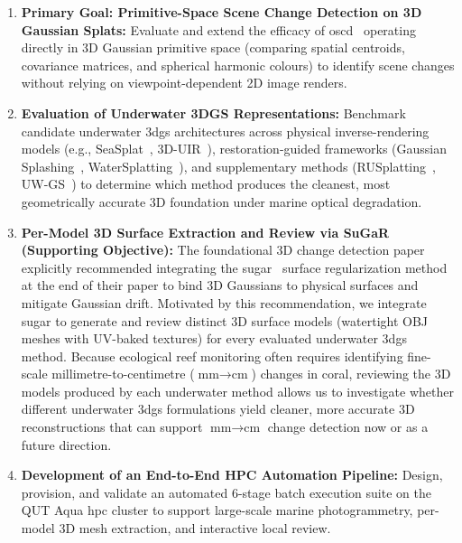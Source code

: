 \begin{enumerate}
    \item \textbf{Primary Goal: Primitive-Space Scene Change Detection on 3D Gaussian Splats:} Evaluate and extend the efficacy of \gls{oscd}~\cite{galappaththige2026pixelsprimitivesscenechange} operating directly in 3D Gaussian primitive space (comparing spatial centroids, covariance matrices, and spherical harmonic colours) to identify scene changes without relying on viewpoint-dependent 2D image renders.
    \item \textbf{Evaluation of Underwater 3DGS Representations:} Benchmark candidate underwater \gls{3dgs} architectures across physical inverse-rendering models (e.g., SeaSplat~\cite{11128502}, 3D-UIR~\cite{huang2025restorationreconstructionrethinking3d}), restoration-guided frameworks (Gaussian Splashing~\cite{mualem2025gaussiansplashingdirectvolumetric}, WaterSplatting~\cite{li2025watersplattingfastunderwater3d}), and supplementary methods (RUSplatting~\cite{jiang2025rusplattingrobust3dgaussian}, UW-GS~\cite{10943785}) to determine which method produces the cleanest, most geometrically accurate 3D foundation under marine optical degradation.
    \item \textbf{Per-Model 3D Surface Extraction and Review via SuGaR (Supporting Objective):} The foundational 3D change detection paper~\cite{galappaththige2026pixelsprimitivesscenechange} explicitly recommended integrating the \gls{sugar}~\cite{guedon2024sugar} surface regularization method at the end of their paper to bind 3D Gaussians to physical surfaces and mitigate Gaussian drift. Motivated by this recommendation, we integrate \gls{sugar} to generate and review distinct 3D surface models (watertight OBJ meshes with UV-baked textures) for every evaluated underwater \gls{3dgs} method. Because ecological reef monitoring often requires identifying fine-scale millimetre-to-centimetre ($\text{mm} \to \text{cm}$) changes in coral, reviewing the 3D models produced by each underwater method allows us to investigate whether different underwater \gls{3dgs} formulations yield cleaner, more accurate 3D reconstructions that can support $\text{mm} \to \text{cm}$ change detection now or as a future direction.
    \item \textbf{Development of an End-to-End HPC Automation Pipeline:} Design, provision, and validate an automated 6-stage batch execution suite on the QUT Aqua \gls{hpc} cluster to support large-scale marine photogrammetry, per-model 3D mesh extraction, and interactive local review.
\end{enumerate}

